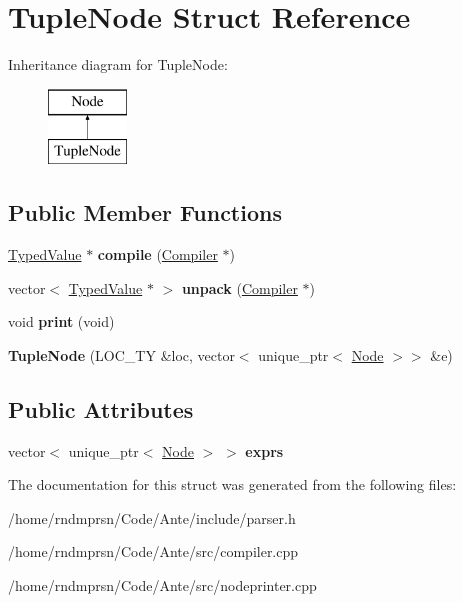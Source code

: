\hypertarget{structTupleNode}{}\section{Tuple\+Node Struct Reference}
\label{structTupleNode}
Inheritance diagram for Tuple\+Node\+:\begin{figure}[H]
\begin{center}
\leavevmode
\includegraphics[height=2.000000cm]{structTupleNode}
\end{center}
\end{figure}
\subsection*{Public Member Functions}
\begin{DoxyCompactItemize}
\item 
\mbox{\label{structTupleNode_afa372a3344d643444b1eda3124cf147f}} 
\hyperlink{structTypedValue}{Typed\+Value} $\ast$ {\bfseries compile} (\hyperlink{structante_1_1Compiler}{Compiler} $\ast$)
\item 
\mbox{\label{structTupleNode_abee54ea2edd6d6bf458cd11a42f846ff}} 
vector$<$ \hyperlink{structTypedValue}{Typed\+Value} $\ast$ $>$ {\bfseries unpack} (\hyperlink{structante_1_1Compiler}{Compiler} $\ast$)
\item 
\mbox{\label{structTupleNode_afa2ba0f92f06e6dd9f69af5578961c2e}} 
void {\bfseries print} (void)
\item 
\mbox{\label{structTupleNode_a3a5dd0e5ff47daa6b0cfcb44d5226616}} 
{\bfseries Tuple\+Node} (L\+O\+C\+\_\+\+TY \&loc, vector$<$ unique\+\_\+ptr$<$ \hyperlink{structNode}{Node} $>$$>$ \&e)
\end{DoxyCompactItemize}
\subsection*{Public Attributes}
\begin{DoxyCompactItemize}
\item 
\mbox{\label{structTupleNode_a2c28da20640de4e5cf615257672e5cee}} 
vector$<$ unique\+\_\+ptr$<$ \hyperlink{structNode}{Node} $>$ $>$ {\bfseries exprs}
\end{DoxyCompactItemize}


The documentation for this struct was generated from the following files\+:\begin{DoxyCompactItemize}
\item 
/home/rndmprsn/\+Code/\+Ante/include/parser.\+h\item 
/home/rndmprsn/\+Code/\+Ante/src/compiler.\+cpp\item 
/home/rndmprsn/\+Code/\+Ante/src/nodeprinter.\+cpp\end{DoxyCompactItemize}
